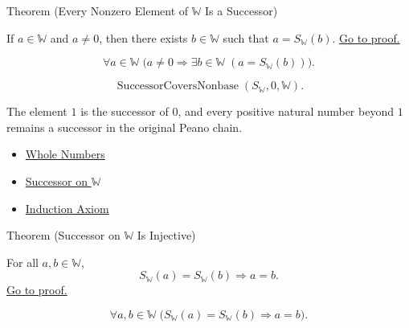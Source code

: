 \begin{theorembox}{Theorem (Every Nonzero Element of \texorpdfstring{$\mathbb{W}$}{W} Is a Successor)}
\begin{theorem}
\label{thm:every-nonzero-w-is-successor}
If $a\in\mathbb{W}$ and $a\neq 0$, then there exists
$b\in\mathbb{W}$ such that $a=S_{\mathbb{W}}(b)$.
\hyperref[prf:every-nonzero-w-is-successor]{Go to proof.}
\end{theorem}
\end{theorembox}

\begin{remark*}
\[
\forall a\in\mathbb{W}\;
\bigl(a\neq 0 \Longrightarrow
\exists b\in\mathbb{W}\;(a=S_{\mathbb{W}}(b))\bigr).
\]
\end{remark*}

\begin{remark*}
\[
\operatorname{SuccessorCoversNonbase}(S_{\mathbb{W}},0,\mathbb{W}).
\]
\end{remark*}

\begin{remark*}[Interpretation]
The element $1$ is the successor of $0$, and every positive natural number
beyond $1$ remains a successor in the original Peano chain.
\end{remark*}

\begin{dependencies}
\begin{itemize}
  \item \hyperref[def:whole-numbers]{Whole Numbers}
  \item \hyperref[def:successor-on-w]{Successor on $\mathbb{W}$}
  \item \hyperref[ax:peano-induction]{Induction Axiom}
\end{itemize}
\end{dependencies}

\begin{theorembox}{Theorem (Successor on \texorpdfstring{$\mathbb{W}$}{W} Is Injective)}
\begin{theorem}
\label{thm:successor-on-w-injective}
For all $a,b\in\mathbb{W}$,
\[
S_{\mathbb{W}}(a)=S_{\mathbb{W}}(b)\Longrightarrow a=b.
\]
\hyperref[prf:successor-on-w-injective]{Go to proof.}
\end{theorem}
\end{theorembox}

\begin{remark*}
\[
\forall a,b\in\mathbb{W}\;
\bigl(S_{\mathbb{W}}(a)=S_{\mathbb{W}}(b)\Longrightarrow a=b\bigr).
\]
\end{remark*}

